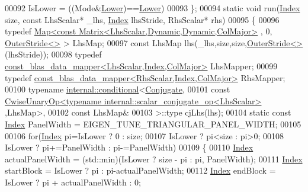 \begin{DoxyCode}
00092     IsLower = ((Mode&\hyperlink{group__enums_gga39e3366ff5554d731e7dc8bb642f83cda891792b8ed394f7607ab16dd716f60e6}{Lower})==\hyperlink{group__enums_gga39e3366ff5554d731e7dc8bb642f83cda891792b8ed394f7607ab16dd716f60e6}{Lower})
00093   \};
00094   \textcolor{keyword}{static} \textcolor{keywordtype}{void} run(\hyperlink{namespace_eigen_a62e77e0933482dafde8fe197d9a2cfde}{Index} size, \textcolor{keyword}{const} LhsScalar* \_lhs, \hyperlink{namespace_eigen_a62e77e0933482dafde8fe197d9a2cfde}{Index} lhsStride, RhsScalar* rhs)
00095   \{
00096     \textcolor{keyword}{typedef} \hyperlink{group___core___module_class_eigen_1_1_map}{Map<const Matrix<LhsScalar,Dynamic,Dynamic,ColMajor>}
      , 0, \hyperlink{class_eigen_1_1_outer_stride}{OuterStride<>} > LhsMap;
00097     \textcolor{keyword}{const} LhsMap lhs(\_lhs,size,size,\hyperlink{class_eigen_1_1_outer_stride}{OuterStride<>}(lhsStride));
00098     \textcolor{keyword}{typedef} \hyperlink{class_eigen_1_1internal_1_1const__blas__data__mapper}{const\_blas\_data\_mapper<LhsScalar,Index,ColMajor>}
       LhsMapper;
00099     \textcolor{keyword}{typedef} \hyperlink{class_eigen_1_1internal_1_1const__blas__data__mapper}{const\_blas\_data\_mapper<RhsScalar,Index,ColMajor>}
       RhsMapper;
00100     \textcolor{keyword}{typename} \hyperlink{struct_eigen_1_1internal_1_1conditional}{internal::conditional}<\hyperlink{class_eigen_1_1_conjugate}{Conjugate},
00101                                    \textcolor{keyword}{const} 
      \hyperlink{group___core___module_class_eigen_1_1_cwise_unary_op}{CwiseUnaryOp<typename internal::scalar\_conjugate\_op<LhsScalar>}
      ,LhsMap>,
00102                                    \textcolor{keyword}{const} LhsMap&
00103                                   >::type cjLhs(lhs);
00104     \textcolor{keyword}{static} \textcolor{keyword}{const} \hyperlink{namespace_eigen_a62e77e0933482dafde8fe197d9a2cfde}{Index} PanelWidth = EIGEN\_TUNE\_TRIANGULAR\_PANEL\_WIDTH;
00105 
00106     \textcolor{keywordflow}{for}(\hyperlink{namespace_eigen_a62e77e0933482dafde8fe197d9a2cfde}{Index} pi=IsLower ? 0 : size;
00107         IsLower ? pi<size : pi>0;
00108         IsLower ? pi+=PanelWidth : pi-=PanelWidth)
00109     \{
00110       \hyperlink{namespace_eigen_a62e77e0933482dafde8fe197d9a2cfde}{Index} actualPanelWidth = (std::min)(IsLower ? size - pi : pi, PanelWidth);
00111       \hyperlink{namespace_eigen_a62e77e0933482dafde8fe197d9a2cfde}{Index} startBlock = IsLower ? pi : pi-actualPanelWidth;
00112       \hyperlink{namespace_eigen_a62e77e0933482dafde8fe197d9a2cfde}{Index} endBlock = IsLower ? pi + actualPanelWidth : 0;

\end{DoxyCode}
